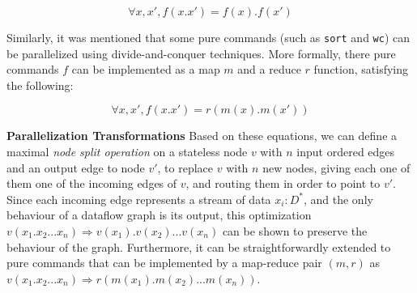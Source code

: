 \documentclass[sigplan,10pt,review,anonymous]{acmart}
\newcommand{\heading}[1]{\vspace{4pt}\noindent\textbf{#1}\enspace}
\newcommand{\ttt}[1]{\texttt{\small #1}}
\newcommand{\tr}[1]{} %
\begin{document}
\[
\forall x, x', f(x.x') = f(x).f(x')
\]

\tr{This is a nice characterization, which I think is true in most
  settings. There is a caveat though: You can have stateless programs
  that emit output when they start (before they consume the stream)
  and/or when they consume the EOF symbol. In this case I am not sure
  the equation above holds.}

Similarly, it was mentioned that some pure commands (such as
\ttt{sort} and \ttt{wc}) can be parallelized using divide-and-conquer
techniques. More formally, there pure commands $f$ can be implemented
as a map $m$ and a reduce $r$ function, satisfying the following:

\[
\forall x, x', f(x.x') = r(m(x).m(x'))
\]

\heading{Parallelization Transformations}
%
Based on these equations, we can define a maximal \emph{node split
  operation} on a stateless node $v$ with $n$ input ordered edges and
an output edge to node $v'$, to replace $v$ with $n$ new nodes, giving
each one of them one of the incoming edges of $v$, and routing them in
order to point to $v'$. Since each incoming edge represents a stream
of data $x_i : D^*$, and the only behaviour of a dataflow graph is its
output, this optimization $ v(x_1.x_2...x_n) \Rightarrow
v(x_1).v(x_2)...v(x_n)$ can be shown to preserve the behaviour of the
graph. Furthermore, it can be straightforwardly extended to pure
commands that can be implemented by a map-reduce pair $(m, r)$ as $
v(x_1.x_2...x_n) \Rightarrow r(m(x_1).m(x_2)...m(x_n))$.

\tr{Remember to mention the assumptions that need to hold for the
  graph transformations to be valid in the Command categories
  section. Commands must be deterministic, they must not do any other
  side effect (such as writing to other files, sending signals,
  etc). However, these assumptions must already be checked when the
  developer designates the categories.}

\tr{If there is time I can work out a formal definition and a proof
  sketch why this transformation preserves the output of the dataflow
  graph.}

\end{document}
